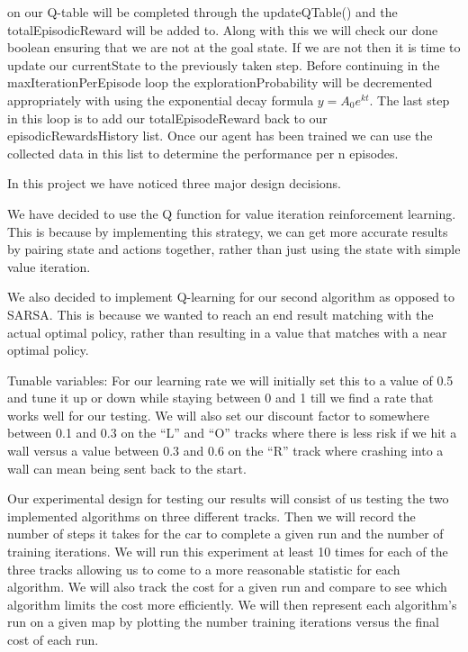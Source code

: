 \documentclass{article}
\begin{document}
\begin{enumerate}
    on our Q-table will be completed through the updateQTable() and the totalEpisodicReward will be added to. Along with this we 
    will check our done boolean ensuring that we are not at the goal state. If we are not then it is time to update our currentState 
    to the previously taken step. Before continuing in the maxIterationPerEpisode loop the explorationProbability will be decremented 
    appropriately with using the exponential decay formula $y=A_0 e^{kt}$. The last step in this loop is 
    to add our totalEpisodeReward back to our episodicRewardsHistory list. Once our agent has been trained we can use the collected 
    data in this list to determine the performance per n episodes. 
\end{enumerate}




In this project we have noticed three major design decisions.

We have decided to use the Q function for value iteration reinforcement learning. This is because by implementing this 
strategy, we can get more accurate results by pairing state and actions together, rather than just using the 
state with simple value iteration.

We also decided to implement Q-learning for our second algorithm as opposed to SARSA. This is because we wanted 
to reach an end result matching with the actual optimal policy, rather than resulting in a value that 
matches with a near optimal policy. 

Tunable variables: For our learning rate we will initially set this to a value of 0.5 and tune it up or 
down while staying between 0 and 1 till we find a rate that works well for our testing. We will also set 
our discount factor to somewhere between 0.1 and 0.3 on the “L” and “O” tracks where there is less risk 
if we hit a wall versus a value between 0.3 and 0.6 on the “R” track where crashing into a wall can 
mean being sent back to the start. 





Our experimental design for testing our results will consist of us testing the two implemented 
algorithms on three different tracks. Then we will record the number of steps it takes for the car 
to complete a given run and the number of training iterations. We will run this experiment at least 
10 times for each of the three tracks allowing us to come to a more reasonable statistic for each 
algorithm. We will also track the cost for a given run and compare to see which algorithm limits 
the cost more efficiently. We will then represent each algorithm’s run on a given map by plotting 
the number training iterations versus the final cost of each run.
\end{document}
